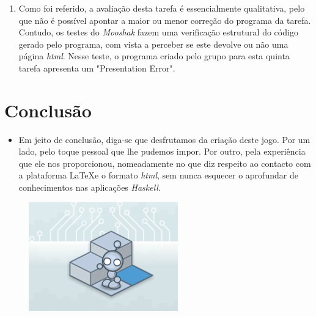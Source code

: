 \documentclass[12pt, a4paper]{article}
\begin{document}
\begin{enumerate}
\newpage

\item Como foi referido, a avaliação desta tarefa é essencialmente qualitativa, pelo que não é possível apontar a maior ou menor correção do programa da tarefa. Contudo, os testes do \textit{Mooshak} fazem uma verificação estrutural do código gerado pelo programa, com vista a perceber se este devolve ou não uma página \textit{html}. Nesse teste, o programa criado pelo grupo para esta quinta tarefa apresenta um "Presentation Error". 
\end{enumerate}

\section{Conclusão}

\begin{itemize}
    \item Em jeito de conclusão, diga-se que desfrutamos da criação deste jogo. Por um lado, pelo toque pessoal que lhe pudemos impor. Por outro, pela experiência que ele nos proporcionou, nomeadamente no que diz respeito ao contacto com a plataforma \LaTeX e o formato \textit{html}, sem nunca esquecer o aprofundar de conhecimentos nas aplicações \textit{Haskell}. 
\end{itemize}

\begin{figure}[b]
\centering
\includegraphics[scale=0.40]{./Picture2.png}
\end{figure}
\end{document}
